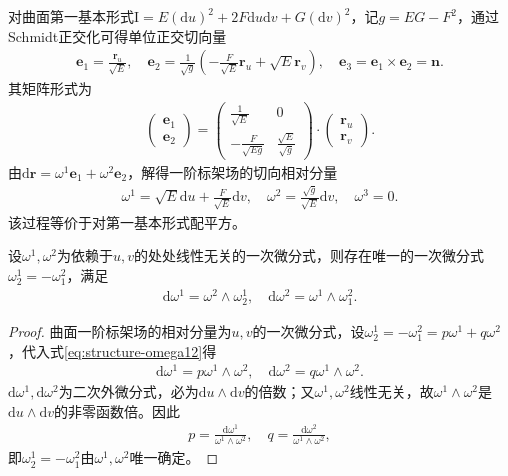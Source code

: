 \documentclass[../../main.tex]{subfiles}%
\begin{document}
对曲面第一基本形式$\mathrm{I}=E(\mathrm{d}u)^2+2F\mathrm{d}u\mathrm{d}v+G(\mathrm{d}v)^2$，记$g=EG-F^2$，通过Schmidt正交化可得单位正交切向量
\begin{align}
\boldsymbol{e}_1=\frac{\boldsymbol{r}_u}{\sqrt{E}},\quad \boldsymbol{e}_2=\frac{1}{\sqrt{g}}\left(-\frac{F}{\sqrt{E}}\boldsymbol{r}_u+\sqrt{E}\boldsymbol{r}_v\right),\quad \boldsymbol{e}_3=\boldsymbol{e}_1\times\boldsymbol{e}_2=\boldsymbol{n}.
\label{eq:schmidt-orth}
\end{align}
其矩阵形式为
\begin{align*}
\begin{pmatrix}\boldsymbol{e}_1\\\boldsymbol{e}_2\end{pmatrix}=\begin{pmatrix}\frac{1}{\sqrt{E}}&0\\-\frac{F}{\sqrt{Eg}}&\frac{\sqrt{E}}{\sqrt{g}}\end{pmatrix}\cdot\begin{pmatrix}\boldsymbol{r}_u\\\boldsymbol{r}_v\end{pmatrix}.
\end{align*}
由$\mathrm{d}\boldsymbol{r}=\omega^1\boldsymbol{e}_1+\omega^2\boldsymbol{e}_2$，解得一阶标架场的切向相对分量
\begin{align}
\omega^1=\sqrt{E}\mathrm{d}u+\frac{F}{\sqrt{E}}\mathrm{d}v,\quad \omega^2=\frac{\sqrt{g}}{\sqrt{E}}\mathrm{d}v,\quad \omega^3=0.
\label{eq:first-order-omega12}
\end{align}
该过程等价于对第一基本形式配平方。

\begin{theorem}
设$\omega^1,\omega^2$为依赖于$u,v$的处处线性无关的一次微分式，则存在唯一的一次微分式$\omega_2^1=-\omega_1^2$，满足
\begin{align}
\mathrm{d}\omega^1=\omega^2\wedge\omega_2^1,\quad \mathrm{d}\omega^2=\omega^1\wedge\omega_1^2.
\label{eq:structure-omega12}
\end{align}
\end{theorem}

\begin{proof}
曲面一阶标架场的相对分量为$u,v$的一次微分式，设$\omega_2^1=-\omega_1^2=p\omega^1+q\omega^2$，代入式\eqref{eq:structure-omega12}得
\begin{align*}
\mathrm{d}\omega^1=p\omega^1\wedge\omega^2,\quad \mathrm{d}\omega^2=q\omega^1\wedge\omega^2.
\end{align*}
$\mathrm{d}\omega^1,\mathrm{d}\omega^2$为二次外微分式，必为$\mathrm{d}u\wedge\mathrm{d}v$的倍数；又$\omega^1,\omega^2$线性无关，故$\omega^1\wedge\omega^2$是$\mathrm{d}u\wedge\mathrm{d}v$的非零函数倍。因此
\begin{align*}
p=\frac{\mathrm{d}\omega^1}{\omega^1\wedge\omega^2},\quad q=\frac{\mathrm{d}\omega^2}{\omega^1\wedge\omega^2},
\end{align*}
即$\omega_2^1=-\omega_1^2$由$\omega^1,\omega^2$唯一确定。
\end{proof}
\end{document}
